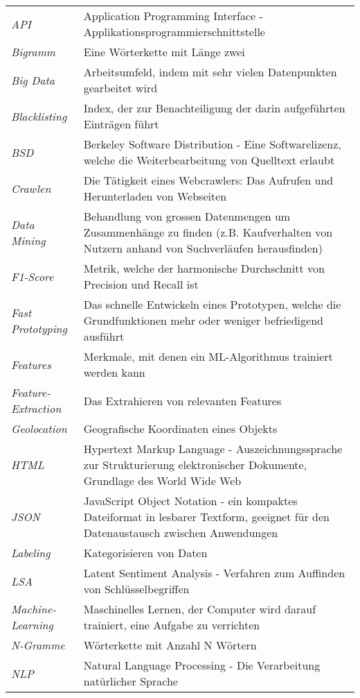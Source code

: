 
\begin{table}[H]
	\begin{tabular}{>{\em}p{4cm}p{12cm}}
		API & Application Programming Interface - Applikationsprogrammierschnittstelle\\
		Bigramm & Eine Wörterkette mit Länge zwei\\
		Big Data & Arbeitsumfeld, indem mit sehr vielen Datenpunkten gearbeitet wird\\
		Blacklisting & Index, der zur Benachteiligung der darin aufgeführten Einträgen führt\\
		BSD & Berkeley Software Distribution - Eine Softwarelizenz, welche die Weiterbearbeitung von Quelltext erlaubt\\
		Crawlen & Die Tätigkeit eines Webcrawlers: Das Aufrufen und Herunterladen von Webseiten\\
		Data Mining & Behandlung von grossen Datenmengen um Zusammenhänge zu finden (z.B. Kaufverhalten von Nutzern anhand von Suchverläufen herausfinden)\\
		F1-Score & Metrik, welche der harmonische Durchschnitt von Precision und Recall ist\\
		Fast Prototyping & Das schnelle Entwickeln eines Prototypen, welche die Grundfunktionen mehr oder weniger befriedigend ausführt\\
		Features & Merkmale, mit denen ein ML-Algorithmus trainiert werden kann\\
		Feature-Extraction & Das Extrahieren von relevanten Features\\
		Geolocation & Geografische Koordinaten eines Objekts\\
		HTML & Hypertext Markup Language - Auszeichnungssprache zur Strukturierung elektronischer Dokumente, Grundlage des World Wide Web\\
		JSON & JavaScript Object Notation - ein kompaktes Dateiformat in lesbarer Textform, geeignet für den Datenaustausch zwischen Anwendungen\\
		Labeling & Kategorisieren von Daten\\
		LSA & Latent Sentiment Analysis - Verfahren zum Auffinden von Schlüsselbegriffen\\
		Machine-Learning & Maschinelles Lernen, der Computer wird darauf trainiert, eine Aufgabe zu verrichten\\
		N-Gramme & Wörterkette mit Anzahl N Wörtern\\
		NLP & Natural Language Processing - Die Verarbeitung natürlicher Sprache\\

\end{tabular}
\end{table}
